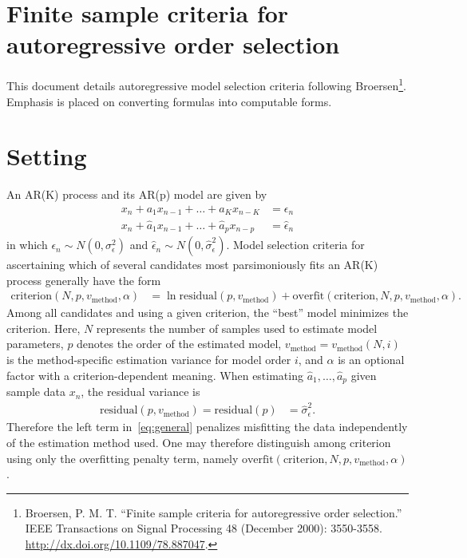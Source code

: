 \documentclass[12pt,letterpaper]{article}
\begin{document}
\section*{Finite sample criteria for autoregressive order selection}

This document details autoregressive model selection criteria following
Broersen\footnote{ Broersen, P. M. T. ``Finite sample criteria
for autoregressive order selection.'' IEEE Transactions on Signal Processing 48
(December 2000): 3550-3558.  \url{http://dx.doi.org/10.1109/78.887047}.}.
Emphasis is placed on converting formulas into computable forms.

\section*{Setting}

An AR(K) process and its AR(p) model are given by
\begin{subequations}
\begin{align}
    x_n+a_1x_{n-1}+\dots+a_Kx_{n-K}&=\epsilon_n
    \\
    {x}_n+\hat{a}_1x_{n-1}+\dots+\hat{a}_px_{n-p}&=\hat{\epsilon}_n
\end{align}
\end{subequations}
in which $\epsilon_n\sim N\left(0,\sigma_{\epsilon}^2\right)$ and
$\hat{\epsilon}_n\sim N\left(0,\hat{\sigma}_{\epsilon}^2\right)$.
Model selection criteria for ascertaining which of several candidates
most parsimoniously fits an AR(K) process generally have the form
\begin{align}
    \label{eq:general}
    \text{criterion}\!\left(N,p,v_\text{method},\alpha\right)
    &=
    \ln \text{residual}\!\left(p,v_\text{method}\right)
    +
    \text{overfit}\!\left(\text{criterion},N,p,v_\text{method},\alpha\right)
    .
\end{align}
Among all candidates and using a given criterion, the ``best'' model minimizes
the criterion.  Here, $N$ represents the number of samples used to estimate
model parameters, $p$ denotes the order of the estimated model,
$v_\text{method}=v_\text{method}\!\left(N,i\right)$ is the method-specific
estimation variance for model order $i$, and $\alpha$ is an optional factor
with a criterion-dependent meaning.  When estimating
$\hat{a}_1,\dots,\hat{a}_p$ given sample data $x_n$, the residual variance is
\begin{align}
    \text{residual}\!\left(p,v_\text{method}\right)
    =
    \text{residual}\!\left(p\right)
    &=
    \hat{\sigma}_\epsilon^2
    .
\end{align}
Therefore the left term in~\eqref{eq:general} penalizes misfitting the data
independently of the estimation method used.  One may therefore distinguish
among criterion using only the overfitting penalty term, namely
$\text{overfit}\!\left(\text{criterion},N,p,v_\text{method},\alpha\right)$.
\end{document}
